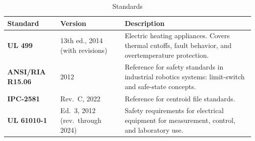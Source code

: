 
\begin{table}[H]
\centering
\caption{Standards}
\label{tab:standards}
\renewcommand{\arraystretch}{1.3}
\small
\begin{tabularx}{\textwidth}{|>{\bfseries}l|l|Y|}
\hline
{}
Standard & \textbf{Version} & \textbf{Description} \\ \hline
UL 499              & 13th ed., 2014 (with revisions) & Electric heating appliances. Covers thermal cutoffs, fault behavior, and overtemperature protection. \\ \hline
ANSI/RIA R15.06     & 2012                            & Reference for safety standards in industrial robotics systems: limit-switch and safe-state concepts. \\ \hline
IPC-2581            & Rev.\ C, 2022                   & Reference for centroid file standards. \\ \hline
UL 61010-1          & Ed.\ 3, 2012 (rev.\ through 2024) & Safety requirements for electrical equipment for measurement, control, and laboratory use. \\ \hline
\end{tabularx}
\end{table}

